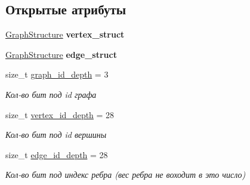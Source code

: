 \subsection*{Открытые атрибуты}
\begin{DoxyCompactItemize}
\item 
\mbox{\label{struct_s_p_u___g_r_a_p_h_1_1_spu_ultra_graph_traits_ac6d36f5d0ed425710df5be62a118f246}} 
\hyperlink{class_s_p_u___g_r_a_p_h_1_1_graph_structure}{Graph\+Structure} {\bfseries vertex\+\_\+struct}
\item 
\mbox{\label{struct_s_p_u___g_r_a_p_h_1_1_spu_ultra_graph_traits_a563b5a8e172263ff3b23574a2edfb46f}} 
\hyperlink{class_s_p_u___g_r_a_p_h_1_1_graph_structure}{Graph\+Structure} {\bfseries edge\+\_\+struct}
\item 
\mbox{\label{struct_s_p_u___g_r_a_p_h_1_1_spu_ultra_graph_traits_af647e861e35133da6e0c0aca38ab6ac7}} 
size\+\_\+t \hyperlink{struct_s_p_u___g_r_a_p_h_1_1_spu_ultra_graph_traits_af647e861e35133da6e0c0aca38ab6ac7}{graph\+\_\+id\+\_\+depth} = 3
\begin{DoxyCompactList}\small\item\em Кол-\/во бит под id графа \end{DoxyCompactList}\item 
\mbox{\label{struct_s_p_u___g_r_a_p_h_1_1_spu_ultra_graph_traits_a8ee6c58e31936df5a1c98ecbdf4e00ed}} 
size\+\_\+t \hyperlink{struct_s_p_u___g_r_a_p_h_1_1_spu_ultra_graph_traits_a8ee6c58e31936df5a1c98ecbdf4e00ed}{vertex\+\_\+id\+\_\+depth} = 28
\begin{DoxyCompactList}\small\item\em Кол-\/во бит под id вершины \end{DoxyCompactList}\item 
\mbox{\label{struct_s_p_u___g_r_a_p_h_1_1_spu_ultra_graph_traits_ad8da6ee1527f0ced8ae14bf3ad3b7cb9}} 
size\+\_\+t \hyperlink{struct_s_p_u___g_r_a_p_h_1_1_spu_ultra_graph_traits_ad8da6ee1527f0ced8ae14bf3ad3b7cb9}{edge\+\_\+id\+\_\+depth} = 28
\begin{DoxyCompactList}\small\item\em Кол-\/во бит под индекс ребра (вес ребра не воходит в это число) \end{DoxyCompactList}\item 

\end{DoxyCompactItemize}
